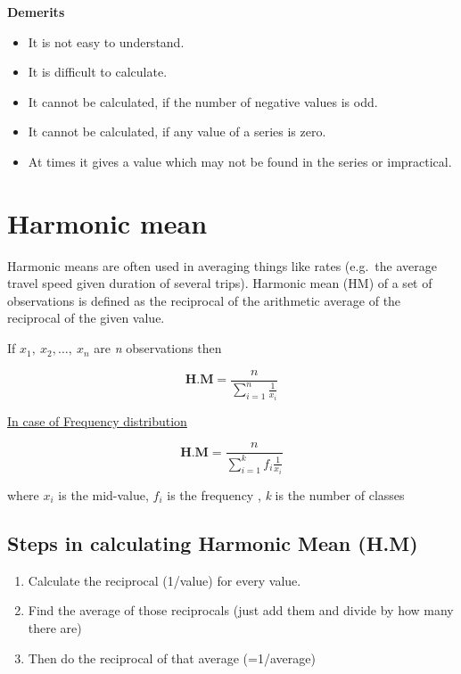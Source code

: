 \documentclass[
]{book}
\begin{document}
{\textbf{Demerits}}

\begin{itemize}
\item
  It is not easy to understand.
\item
  It is difficult to calculate.
\item
  It cannot be calculated, if the number of negative values is odd.
\item
  It cannot be calculated, if any value of a series is zero.
\item
  At times it gives a value which may not be found in the series or
  impractical.
\end{itemize}

\hypertarget{harmonic-mean}{%
\section{Harmonic mean}\label{harmonic-mean}}

Harmonic means are often used in averaging things like rates (e.g.~the
average travel speed given duration of several trips). Harmonic mean
(HM) of a set of observations is defined as the reciprocal of the
arithmetic average of the reciprocal of the given value.

If \(x_{1},\ x_{2},\ldots,\ x_{n}\) are \emph{n} observations then

\[\mathbf{\text{H.M}} = \frac{n}{\sum_{i = 1}^{n}\frac{1}{x_{i}}}\]

\ul{In case of Frequency distribution}

\[\mathbf{\text{H.M}} = \frac{n}{\sum_{i = 1}^{k}{f_{i}\frac{1}{x_{i}}}}\]

where \(x_{i}\) is the mid-value, \(f_{i}\) is the frequency , \emph{k} is the
number of classes

\hypertarget{steps-in-calculating-harmonic-mean-h.m}{%
\subsection{Steps in calculating Harmonic Mean (H.M)}\label{steps-in-calculating-harmonic-mean-h.m}}

\begin{enumerate}
\def\labelenumi{\arabic{enumi}.}
\item
  Calculate the reciprocal (1/value) for every value.
\item
  Find the average of those reciprocals (just add them and divide by
  how many there are)
\item
  Then do the reciprocal of that average (=1/average)
\end{enumerate}
\end{document}
